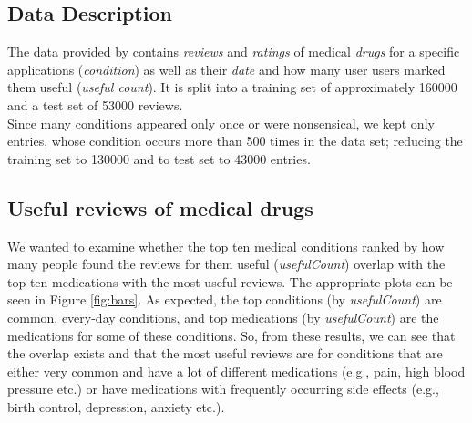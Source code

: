 \documentclass{article}
\begin{document}
\subsection{Data Description}
The data provided by \cite{data} contains \emph{reviews} and \emph{ratings} of medical \emph{drugs} for a specific applications (\emph{condition}) as well as their \emph{date} and how many user users marked them useful (\emph{useful count}). It is split into a training set of approximately \num[group-separator={,}]{160000} and a test set of \num[group-separator={,}]{53000} reviews.\\
Since many conditions appeared only once or were nonsensical, we kept only entries, whose condition occurs more than 500 times in the data set; reducing the training set to \num[group-separator={,}]{130000} and to test set to \num[group-separator={,}]{43000} entries.



\subsection{Useful reviews of medical drugs}
We wanted to examine whether the top ten medical conditions ranked by how many people found the reviews for them useful (\emph{usefulCount}) overlap with the top ten medications with the most useful reviews. The appropriate plots can be seen in Figure \ref{fig:bars}. As expected, the top conditions (by \emph{usefulCount})  are common, every-day conditions, and top medications (by \emph{usefulCount}) are the medications for some of these conditions. So, from these results, we can see that the overlap exists and that the most useful reviews are for conditions that are either very common and have a lot of different medications (e.g., pain, high blood pressure etc.) or have medications with frequently occurring side effects (e.g., birth control, depression, anxiety etc.).
\end{document}
